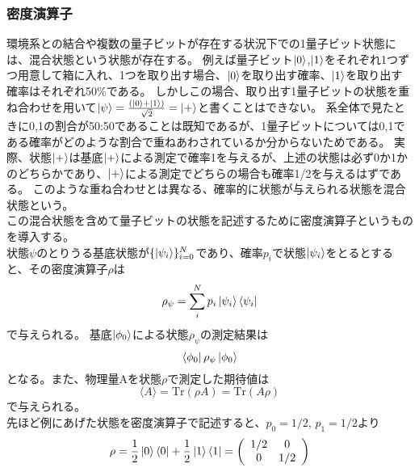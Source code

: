         \subsubsection{密度演算子}
        環境系との結合や複数の量子ビットが存在する状況下での1量子ビット状態には、混合状態という状態が存在する。
        例えば量子ビット$\ket{0}$,$\ket{1}$をそれぞれ1つずつ用意して箱に入れ、1つを取り出す場合、$\ket{0}$を取り出す確率、$\ket{1}$を取り出す確率はそれぞれ50\%である。
        しかしこの場合、取り出す1量子ビットの状態を重ね合わせを用いて$\ket{\psi} = \frac{(\ket{0}+\ket{1})}{\sqrt2}=\ket{+}$と書くことはできない。
        系全体で見たときに0,1の割合が50:50であることは既知であるが、1量子ビットについては0,1である確率がどのような割合で重ねあわされているか分からないためである。
        実際、状態$\ket{+}$は基底$\ket{+}$による測定で確率1を与えるが、上述の状態は必ず0か1かのどちらかであり、$\ket{+}$による測定でどちらの場合も確率1/2を与えるはずである。
        このような重ね合わせとは異なる、確率的に状態が与えられる状態を混合状態という。\\
        この混合状態を含めて量子ビットの状態を記述するために密度演算子というものを導入する。\\
        状態$\psi$のとりうる基底状態が$\{\ket{\psi_i}\}_{i=0}^N$であり、確率$p_i$で状態$\ket{\psi_i}$をとるとすると、その密度演算子$\rho$は
        \begin{equation}
            \rho_\psi=\sum_i^N p_i \ket{\psi_i}\bra{\psi_i}
        \end{equation}
        で与えられる。
        基底$\ket{\phi_0}$による状態$\rho_\psi$の測定結果は
        \begin{equation*}
            \bra{\phi_0}\rho_\psi\ket{\phi_0}
        \end{equation*}
        となる。また、物理量Aを状態$\rho$で測定した期待値は
        \begin{equation}
            \langle A \rangle =\mathrm{Tr}(\rho A)=\mathrm{Tr}(A\rho)
        \end{equation}
        で与えられる。\\
        先ほど例にあげた状態を密度演算子で記述すると、$p_0=1/2$, $p_1=1/2$より
        \begin{equation*}
            \rho=\frac{1}{2}\ket{0}\bra{0}+\frac{1}{2}\ket{1}\bra{1}
            =\left(
                \begin{array}{cc}
                  1/2 & 0\\
                  0 & 1/2\\
                \end{array}
              \right)
        \end{equation*}
